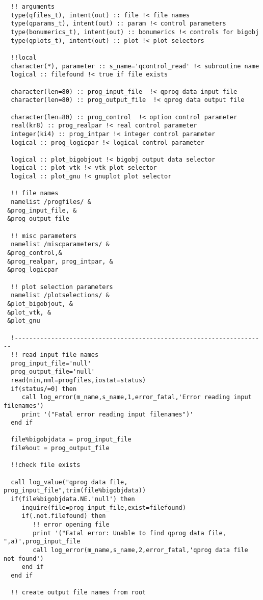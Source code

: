 \begin{verbatim}
  !! arguments
  type(qfiles_t), intent(out) :: file !< file names
  type(qparams_t), intent(out) :: param !< control parameters
  type(bonumerics_t), intent(out) :: bonumerics !< controls for bigobj
  type(qplots_t), intent(out) :: plot !< plot selectors

  !!local
  character(*), parameter :: s_name='qcontrol_read' !< subroutine name
  logical :: filefound !< true if file exists

  character(len=80) :: prog_input_file  !< qprog data input file
  character(len=80) :: prog_output_file  !< qprog data output file

  character(len=80) :: prog_control  !< option control parameter
  real(kr8) :: prog_realpar !< real control parameter
  integer(ki4) :: prog_intpar !< integer control parameter
  logical :: prog_logicpar !< logical control parameter

  logical :: plot_bigobjout !< bigobj output data selector
  logical :: plot_vtk !< vtk plot selector
  logical :: plot_gnu !< gnuplot plot selector

  !! file names
  namelist /progfiles/ &
 &prog_input_file, &
 &prog_output_file

  !! misc parameters
  namelist /miscparameters/ &
 &prog_control,&
 &prog_realpar, prog_intpar, &
 &prog_logicpar

  !! plot selection parameters
  namelist /plotselections/ &
 &plot_bigobjout, &
 &plot_vtk, &
 &plot_gnu

  !---------------------------------------------------------------------
  !! read input file names
  prog_input_file='null'
  prog_output_file='null'
  read(nin,nml=progfiles,iostat=status)
  if(status/=0) then
     call log_error(m_name,s_name,1,error_fatal,'Error reading input filenames')
     print '("Fatal error reading input filenames")'
  end if

  file%bigobjdata = prog_input_file
  file%out = prog_output_file

  !!check file exists

  call log_value("qprog data file, prog_input_file",trim(file%bigobjdata))
  if(file%bigobjdata.NE.'null') then
     inquire(file=prog_input_file,exist=filefound)
     if(.not.filefound) then
        !! error opening file
        print '("Fatal error: Unable to find qprog data file, ",a)',prog_input_file
        call log_error(m_name,s_name,2,error_fatal,'qprog data file not found')
     end if
  end if

  !! create output file names from root


\end{verbatim}
